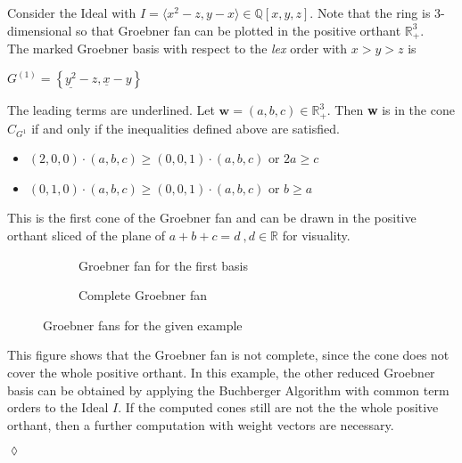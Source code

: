 \begin{env_example}\normalfont
Consider the Ideal with $ I = \langle x^{2}-z,y-x \rangle \in \mathbb{Q}\left[ x,y,z\right] .$
Note that the ring is 3-dimensional so that Groebner fan can be plotted in the positive orthant $ \mathbb{R}^{3}_{+}$. \\
The marked Groebner basis with respect to the \textit{lex} order with $x>y>z$ is
\begin{center}
$G^{\left( 1\right) } = \left\lbrace \underline{y^{2}}-z,\underline{x} -y\right\rbrace $
\end{center}
The leading terms are underlined. Let $\textbf{w} = \left( a,b,c\right) \in \mathbb{R}^{3}_{+} $. Then \textbf{w} is in the cone $C_{G^{1}}$ if and only if the inequalities defined above are satisfied.

\begin{itemize}

\item
$\left( 2,0,0\right) \cdot \left( a,b,c\right) \geq \left( 0,0,1\right) \cdot \left( a,b,c\right) $ or $2a\geq c$ 
\item
$\left( 0,1,0\right) \cdot \left( a,b,c\right) \geq \left( 0,0,1\right) \cdot \left( a,b,c\right) $ or $b\geq a$ 

\end{itemize} 

This is the first cone of the Groebner fan and can be drawn in the positive orthant sliced of the plane of $a+b+c=d~,d\in \mathbb{R}$ for visuality.


\begin{figure}
    \centering
    \begin{subfigure}[b]{0.48\linewidth}        %
        \centering
        
        \caption{Groebner fan for the first basis}
        \label{fig:singlegroebner}
    \end{subfigure}
    \begin{subfigure}[b]{0.48\linewidth}        %
        \centering
        
        \caption{Complete Groebner fan}
        \label{fig:completegroebner}
    \end{subfigure}
    \caption{Groebner fans for the given example}
    \label{fig:groebnerfans}
\end{figure}




This figure shows that the Groebner fan is not complete, since the cone does not cover the whole positive orthant. In this example, the other reduced Groebner basis can be obtained by applying the Buchberger Algorithm with common term orders to the Ideal $I$.
If the computed cones still are not the the whole positive orthant, then a further computation with weight vectors are necessary.

\begin{flushright}
$\lozenge$
\end{flushright} 
\end{env_example}

